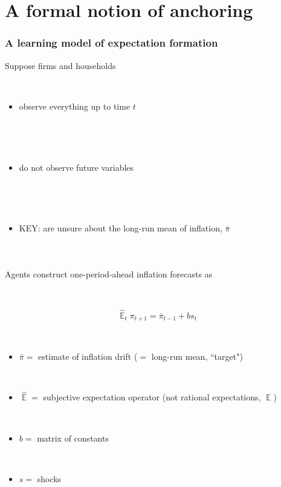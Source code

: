 \documentclass{beamer}
\DeclareMathOperator{\E}{\mathbb{E}}
\begin{document}
\section{A formal notion of anchoring}
\begin{frame}
	\frametitle{A learning model of expectation formation}
Suppose firms and households

\

\begin{itemize}
\item observe everything up to time $t$ 

\

\

\item do not observe future variables

\

\

\item KEY: are unsure about the long-run mean of inflation, $\bar{\pi}$
\end{itemize}


\



\end{frame}

\begin{frame}
	\frametitle{}

Agents construct one-period-ahead inflation forecasts as

\

\begin{equation}
\hat{\E}_{t}\pi_{t+1} =  \bar{\pi}_{t-1}+bs_{t}
\end{equation}

\

\begin{itemize}
\item[] $\bar{\pi} =$ estimate of inflation drift ($=$ long-run mean, ``target")

\



\item[] $\hat{\E} =$ subjective expectation operator (not rational expectations, $\E$)

\



\item[] $b =$ matrix of constants 

\

\item[] $s =$ shocks
\end{itemize}

\



\end{frame}
\end{document}
